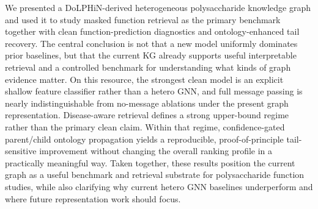 \documentclass[11pt]{article}
\begin{document}
We presented a DoLPHiN-derived heterogeneous polysaccharide knowledge graph and used it to study masked function retrieval as the primary benchmark together with clean function-prediction diagnostics and ontology-enhanced tail recovery. The central conclusion is not that a new model uniformly dominates prior baselines, but that the current KG already supports useful interpretable retrieval and a controlled benchmark for understanding what kinds of graph evidence matter. On this resource, the strongest clean model is an explicit shallow feature classifier rather than a hetero GNN, and full message passing is nearly indistinguishable from no-message ablations under the present graph representation. Disease-aware retrieval defines a strong upper-bound regime rather than the primary clean claim. Within that regime, confidence-gated parent/child ontology propagation yields a reproducible, proof-of-principle tail-sensitive improvement without changing the overall ranking profile in a practically meaningful way. Taken together, these results position the current graph as a useful benchmark and retrieval substrate for polysaccharide function studies, while also clarifying why current hetero GNN baselines underperform and where future representation work should focus.



\end{document}
